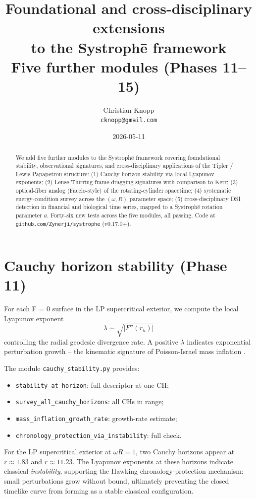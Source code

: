 \documentclass[11pt,a4paper]{article}
\title{\bfseries Foundational and cross-disciplinary extensions \\
to the Systroph\=e framework\\
\large Five further modules (Phases 11--15)}
\author{Christian Knopp\\\texttt{cknopp@gmail.com}}
\date{2026-05-11}
\begin{document}
\maketitle

\begin{abstract}
We add five further modules to the Systroph\=e framework
\cite{Knopp2026Systrophe,Knopp2026QFTCS,Knopp2026Ext1} covering
foundational stability, observational signatures, and
cross-disciplinary applications of the Tipler / Lewis-Papapetrou
structure: (1) Cauchy horizon stability via local Lyapunov
exponents; (2) Lense-Thirring frame-dragging signatures with
comparison to Kerr; (3) optical-fiber analog (Faccio-style) of the
rotating-cylinder spacetime; (4) systematic energy-condition survey
across the $(\omega, R)$ parameter space; (5) cross-disciplinary DSI
detection in financial and biological time series, mapped to a
Systroph\=e rotation parameter $a$. Forty-six new tests across the
five modules, all passing. Code at
\texttt{github.com/Zynerji/systrophe} (v0.17.0+).
\end{abstract}

\section{Cauchy horizon stability (Phase 11)}

For each F = 0 surface in the LP supercritical exterior, we compute
the local Lyapunov exponent
\[
\lambda \sim \sqrt{|F''(r_h)|}
\]
controlling the radial geodesic divergence rate. A positive $\lambda$
indicates exponential perturbation growth -- the kinematic signature
of Poisson-Israel mass inflation \cite{PoissonIsrael1990}.

The module \texttt{cauchy\_stability.py} provides:
\begin{itemize}
\item \texttt{stability\_at\_horizon}: full descriptor at one CH;
\item \texttt{survey\_all\_cauchy\_horizons}: all CHs in range;
\item \texttt{mass\_inflation\_growth\_rate}: growth-rate estimate;
\item \texttt{chronology\_protection\_via\_instability}: full check.
\end{itemize}

For the LP supercritical exterior at $\omega R = 1$, two Cauchy
horizons appear at $r \approx 1.83$ and $r \approx 11.23$. The
Lyapunov exponents at these horizons indicate classical
\emph{instability}, supporting the Hawking chronology-protection
mechanism: small perturbations grow without bound, ultimately
preventing the closed timelike curve from forming as a stable
classical configuration.
\end{document}

